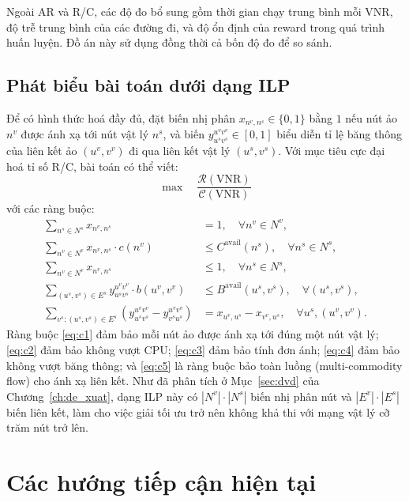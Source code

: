 \documentclass[../DoAn.tex]{subfiles}
\begin{document}
Ngoài AR và R/C, các độ đo bổ sung gồm thời gian chạy trung bình mỗi VNR, độ trễ trung bình của các đường đi, và độ ổn định của reward trong quá trình huấn luyện. Đồ án này sử dụng đồng thời cả bốn độ đo để so sánh.

\subsection{Phát biểu bài toán dưới dạng ILP}

Để có hình thức hoá đầy đủ, đặt biến nhị phân $x_{n^v, n^s} \in \{0,1\}$ bằng $1$ nếu nút ảo $n^v$ được ánh xạ tới nút vật lý $n^s$, và biến $y^{u^v v^v}_{u^s v^s} \in [0, 1]$ biểu diễn tỉ lệ băng thông của liên kết ảo $(u^v, v^v)$ đi qua liên kết vật lý $(u^s, v^s)$. Với mục tiêu cực đại hoá tỉ số R/C, bài toán có thể viết:
\begin{equation}
    \max \quad \frac{\mathcal{R}(\text{VNR})}{\mathcal{C}(\text{VNR})}
\end{equation}
với các ràng buộc:
\begin{align}
    \sum_{n^s \in N^s} x_{n^v, n^s} &= 1, \quad \forall n^v \in N^v, \label{eq:c1}\\
    \sum_{n^v \in N^v} x_{n^v, n^s} \cdot c(n^v) &\leq C^{\text{avail}}(n^s), \quad \forall n^s \in N^s, \label{eq:c2}\\
    \sum_{n^v \in N^v} x_{n^v, n^s} &\leq 1, \quad \forall n^s \in N^s, \label{eq:c3}\\
    \sum_{(u^s, v^s) \in E^s} y^{u^v v^v}_{u^s v^s} \cdot b(u^v, v^v) &\leq B^{\text{avail}}(u^s, v^s), \quad \forall (u^s, v^s), \label{eq:c4}\\
    \sum_{v^s : (u^s, v^s) \in E^s} (y^{u^v v^v}_{u^s v^s} - y^{u^v v^v}_{v^s u^s}) &= x_{u^v, u^s} - x_{v^v, u^s}, \quad \forall u^s, (u^v, v^v). \label{eq:c5}
\end{align}
Ràng buộc \eqref{eq:c1} đảm bảo mỗi nút ảo được ánh xạ tới đúng một nút vật lý; \eqref{eq:c2} đảm bảo không vượt CPU; \eqref{eq:c3} đảm bảo tính đơn ánh; \eqref{eq:c4} đảm bảo không vượt băng thông; và \eqref{eq:c5} là ràng buộc bảo toàn luồng (multi-commodity flow) cho ánh xạ liên kết. Như đã phân tích ở Mục~\ref{sec:dvd} của Chương~\ref{ch:de_xuat}, dạng ILP này có $|N^v| \cdot |N^s|$ biến nhị phân nút và $|E^v| \cdot |E^s|$ biến liên kết, làm cho việc giải tối ưu trở nên không khả thi với mạng vật lý cỡ trăm nút trở lên.

\section{Các hướng tiếp cận hiện tại}
\label{sec:approaches}
\end{document}
